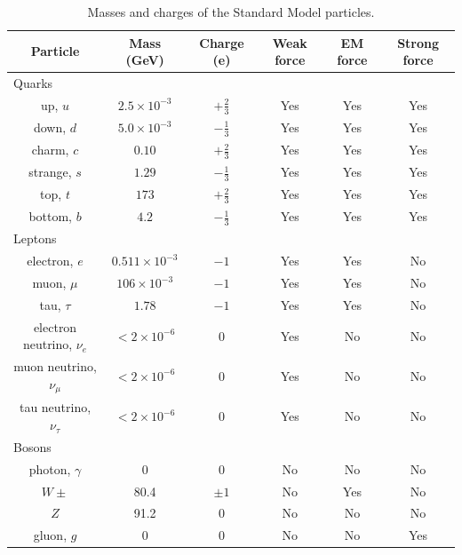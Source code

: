\begin{table}[htbp]
  \begin{center}
    \caption{\fixspacing Masses and charges of the Standard Model particles.}
    \label{TableSMParticles}
    \begin{tabular}[]{ | c | c | c | c | c | c | }
      \hline
      Particle & Mass (GeV) & Charge (e) & Weak force & EM force & Strong force \\ \hline \hline
      \multicolumn{6}{|l|}{Quarks} \\ \hline 
      up, $u$ & $2.5 \times 10^{-3}$ & $+\frac{2}{3}$ & Yes & Yes & Yes \\ \hline
      down, $d$ & $5.0 \times 10^{-3}$ & $-\frac{1}{3}$ & Yes & Yes & Yes \\ \hline
      charm, $c$ & $0.10$ & $+\frac{2}{3}$ & Yes & Yes & Yes \\ \hline
      strange, $s$ & $1.29$ & $-\frac{1}{3}$ & Yes & Yes & Yes \\ \hline
      top, $t$ & $173$ & $+\frac{2}{3}$ & Yes & Yes & Yes \\ \hline
      bottom, $b$ & $4.2$ & $-\frac{1}{3}$ & Yes & Yes & Yes \\ \hline
      \multicolumn{6}{|l|}{Leptons} \\ \hline
      electron, $e$ & $0.511 \times 10^{-3}$ & $-1$ & Yes & Yes & No \\ \hline
      muon, $\mu$ & $106 \times 10^{-3}$ & $-1$ & Yes & Yes & No \\ \hline
      tau, $\tau$ & $1.78$ & $-1$ & Yes & Yes & No \\ \hline
      electron neutrino, $\nu_e$ & $< 2 \times 10^{-6}$ & $0$ & Yes & No & No \\ \hline
      muon neutrino, $\nu_{\mu}$ & $< 2 \times 10^{-6}$ & $0$ & Yes & No & No \\ \hline
      tau neutrino, $\nu_{\tau}$ & $< 2 \times 10^{-6}$ & $0$ & Yes & No & No \\ \hline
      \multicolumn{6}{|l|}{Bosons} \\ \hline
      photon, $\gamma$ & 0 & $0$ & No & No & No \\ \hline
      $W\pm$ & 80.4 & $\pm 1$ & No & Yes & No \\ \hline
      $Z$ & 91.2 & $0$ & No & No & No \\ \hline
      gluon, $g$ & 0 & $0$ & No & No & Yes \\ \hline
    \end{tabular}
  \end{center}
\end{table}


